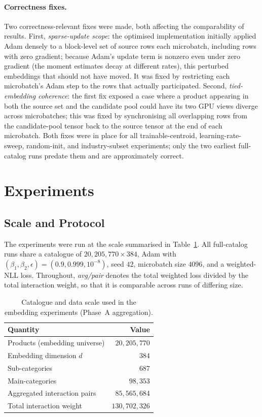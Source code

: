 \paragraph{Correctness fixes.}
Two correctness-relevant fixes were made, both affecting the comparability of
results. First, \emph{sparse-update scope}: the optimised implementation
initially applied Adam densely to a block-level set of source rows each
microbatch, including rows with zero gradient; because Adam's update term is
nonzero even under zero gradient (the moment estimates decay at different
rates), this perturbed embeddings that should not have moved. It was fixed by
restricting each microbatch's Adam step to the rows that actually participated.
Second, \emph{tied-embedding coherence}: the first fix exposed a case where a
product appearing in both the source set and the candidate pool could have its
two GPU views diverge across microbatches; this was fixed by synchronising all
overlapping rows from the candidate-pool tensor back to the source tensor at the
end of each microbatch. Both fixes were in place for all trainable-centroid,
learning-rate-sweep, random-init, and industry-subset experiments; only the two
earliest full-catalog runs predate them and are approximately correct.

\section{Experiments}
\label{sec:emb-experiments}

\subsection{Scale and Protocol}
The experiments were run at the scale summarised in
Table~\ref{tab:emb-scale}. All full-catalog runs share a catalogue of
$20{,}205{,}770\times 384$, Adam with $(\beta_1,\beta_2,\epsilon)=(0.9,0.999,
10^{-8})$, seed $42$, microbatch size $4096$, and a weighted-NLL loss.
Throughout, \emph{avg/pair} denotes the total weighted loss divided by the total
interaction weight, so that it is comparable across runs of differing size.

\begin{table}[ht]
  \centering
  \caption{Catalogue and data scale used in the embedding experiments
           (Phase~A aggregation).}
  \label{tab:emb-scale}
  \begin{tabular}{lr}
    \toprule
    Quantity & Value \\
    \midrule
    Products (embedding universe)     & $20{,}205{,}770$ \\
    Embedding dimension $d$           & $384$ \\
    Sub-categories                    & $687$ \\
    Main-categories                   & $98{,}353$ \\
    Aggregated interaction pairs      & $85{,}565{,}684$ \\
    Total interaction weight          & $130{,}702{,}326$ \\
    \bottomrule
  \end{tabular}
\end{table}

